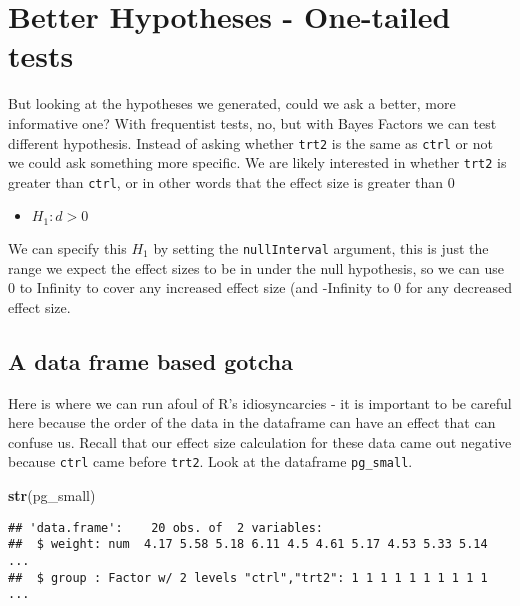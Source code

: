 \documentclass[
]{book}
\newenvironment{Shaded}{\begin{snugshade}}{\end{snugshade}}
\newcommand{\KeywordTok}[1]{\textcolor[rgb]{0.13,0.29,0.53}{\textbf{#1}}}
\newcommand{\NormalTok}[1]{#1}
\providecommand{\tightlist}{%
  \setlength{\itemsep}{0pt}\setlength{\parskip}{0pt}}
\begin{document}
\hypertarget{better-hypotheses---one-tailed-tests}{%
\section{Better Hypotheses - One-tailed tests}\label{better-hypotheses---one-tailed-tests}}

But looking at the hypotheses we generated, could we ask a better, more informative one? With frequentist tests, no, but with Bayes Factors we can test different hypothesis. Instead of asking whether \texttt{trt2} is the same as \texttt{ctrl} or not we could ask something more specific. We are likely interested in whether \texttt{trt2} is greater than \texttt{ctrl}, or in other words that the effect size is greater than 0

\begin{itemize}
\tightlist
\item
  \(H_1 : d > 0\)
\end{itemize}

We can specify this \(H_1\) by setting the \texttt{nullInterval} argument, this is just the range we expect the effect sizes to be in under the null hypothesis, so we can use 0 to Infinity to cover any increased effect size (and -Infinity to 0 for any decreased effect size.

\hypertarget{a-data-frame-based-gotcha}{%
\subsection{A data frame based gotcha}\label{a-data-frame-based-gotcha}}

Here is where we can run afoul of R's idiosyncarcies - it is important to be careful here because the order of the data in the dataframe can have an effect that can confuse us. Recall that our effect size calculation for these data came out negative because \texttt{ctrl} came before \texttt{trt2}. Look at the dataframe \texttt{pg\_small}.

\begin{Shaded}
\begin{Highlighting}[]
\KeywordTok{str}\NormalTok{(pg_small)}
\end{Highlighting}
\end{Shaded}

\begin{verbatim}
## 'data.frame':    20 obs. of  2 variables:
##  $ weight: num  4.17 5.58 5.18 6.11 4.5 4.61 5.17 4.53 5.33 5.14 ...
##  $ group : Factor w/ 2 levels "ctrl","trt2": 1 1 1 1 1 1 1 1 1 1 ...
\end{verbatim}
\end{document}
